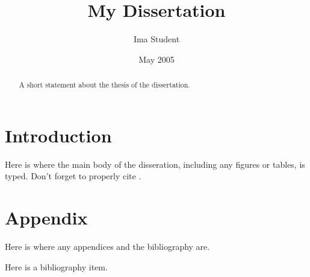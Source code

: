 \documentclass[12pt]{yalephd}
\author{Ima Student}
\title{My Dissertation}
\date{May 2005}
\begin{document}
\frontmatter
\begin{abstract}
A short statement about the thesis of the dissertation.
\end{abstract}
\maketitle
\makecopyright
\tableofcontents
\listoffigures
\listoftables

\mainmatter

\chapter{Introduction}

Here is where the main body of the disseration, including any figures or tables, is typed. Don't forget to properly cite \cite{cite01}.

\backmatter
\chapter*{Appendix}

Here is where any appendices and the bibliography are.

\begin{thebibliography}{99}
 Here is a bibliography item.
\end{thebibliography}
\end{document}
